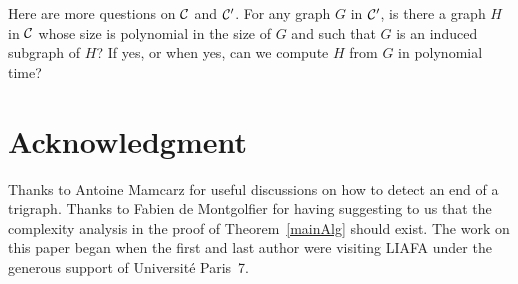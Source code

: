 \documentclass[11 pt] {article}
\begin{document}
Here are more questions on $\cal C$ and ${\cal C}'$.
For any graph $G$ in ${\cal C}'$, is there a graph $H$ in
${\cal C}$ whose size is polynomial in the size of $G$ and such
that $G$ is an induced subgraph of $H$?  If yes, or when yes, can we
compute $H$ from $G$ in polynomial time?  


\section*{Acknowledgment}

Thanks to Antoine Mamcarz for useful discussions on how to detect an
end of a trigraph. Thanks to Fabien de Montgolfier for having
suggesting to us that the complexity analysis in the proof of
Theorem~\ref{mainAlg} should exist.  The work on this paper began when
the first and last author were visiting LIAFA under the generous
support of Universit\'e Paris~7.
\end{document}
